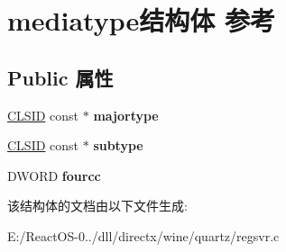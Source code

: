 \hypertarget{structmediatype}{}\section{mediatype结构体 参考}
\label{structmediatype}
\subsection*{Public 属性}
\begin{DoxyCompactItemize}
\item 
\mbox{\label{structmediatype_ae9e7543d0f1ebb2c76dad7dec61bc765}} 
\hyperlink{struct___i_i_d}{C\+L\+S\+ID} const  $\ast$ {\bfseries majortype}
\item 
\mbox{\label{structmediatype_aec9a17239a2805b5fdcf1d551039b58c}} 
\hyperlink{struct___i_i_d}{C\+L\+S\+ID} const  $\ast$ {\bfseries subtype}
\item 
\mbox{\label{structmediatype_afa23ed5dfab5a4d099616b223d01d623}} 
D\+W\+O\+RD {\bfseries fourcc}
\end{DoxyCompactItemize}


该结构体的文档由以下文件生成\+:\begin{DoxyCompactItemize}
\item 
E\+:/\+React\+O\+S-\/0../dll/directx/wine/quartz/regsvr.\+c\end{DoxyCompactItemize}
